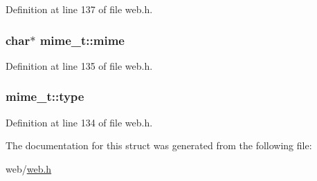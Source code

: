 Definition at line 137 of file web.\-h.

\hypertarget{structmime__t_ad796d16eaee60d7435bff66b2e9b8a8d}{
\subsubsection[{mime}]{\setlength{\rightskip}{0pt plus 5cm}char$\ast$ mime\-\_\-t\-::mime}}\label{structmime__t_ad796d16eaee60d7435bff66b2e9b8a8d}


Definition at line 135 of file web.\-h.

\hypertarget{structmime__t_ae69826dcfd475d65fa0fe8a1574bb3af}{
\subsubsection[{type}]{ mime\-\_\-t\-::type}}\label{structmime__t_ae69826dcfd475d65fa0fe8a1574bb3af}


Definition at line 134 of file web.\-h.



The documentation for this struct was generated from the following file\-:\begin{DoxyCompactItemize}
\item 
web/\hyperlink{web_8h}{web.\-h}\end{DoxyCompactItemize}
